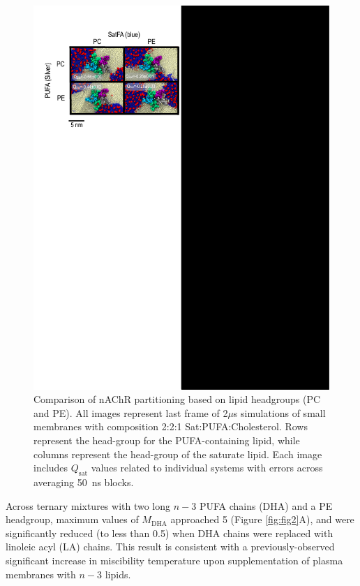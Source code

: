 \documentclass[final,3p,times,twocolumn]{elsarticle}
\newcommand{\qsat}{Q_{\mathrm{sat}}}
\newcommand{\mself}[1]{M_{\mathrm{#1}}}
\begin{document}
	\begin{figure}[!ht]
		\center
		\includegraphics[width=1\linewidth]{SI_Q.pdf}
		\caption{ Comparison of nAChR partitioning based on lipid headgroups (PC and PE). All images represent last frame of 2$\mu$s  simulations of small membranes with composition  2:2:1 Sat:PUFA:Cholesterol.  Rows represent the head-group for the PUFA-containing lipid, while columns represent the head-group of the saturate lipid.   Each image includes $\qsat$ values related to individual systems with errors across averaging 50~ns blocks.}
		\label{fig:SIQ}
	\end{figure}
	Across ternary mixtures with two long $n-3$ PUFA chains (DHA) and a PE headgroup, maximum values of $\mself{DHA}$ approached 5 (Figure \ref{fig:fig2}A), and were significantly reduced (to less than 0.5) when DHA chains were replaced with linoleic acyl (LA) chains. This result is consistent with a previously-observed significant increase in miscibility temperature upon supplementation of plasma membranes with $n-3$ lipids.  \cite{Levental_Polyunsaturated_2016} 
	
\end{document}
